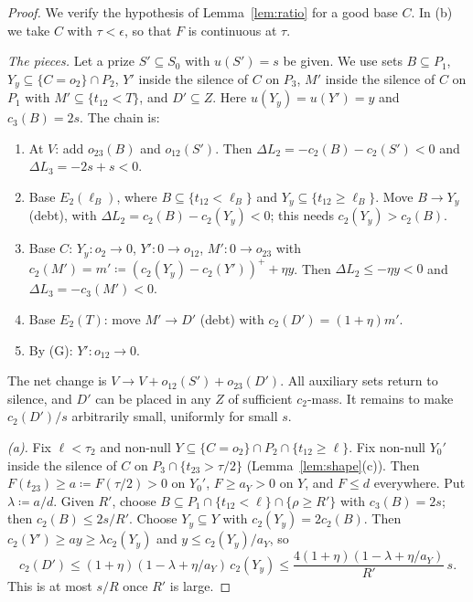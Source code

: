 \documentclass[11pt]{article}
\theoremstyle{definition}\newtheorem{definition}[theorem]{Definition}
\theoremstyle{remark}\newtheorem{remark}[theorem]{Remark}
\begin{document}
\begin{proof}
We verify the hypothesis of Lemma~\ref{lem:ratio} for a good base $C$. In (b)
we take $C$ with $\tau<\epsilon$, so that $F$ is continuous at $\tau$.

\emph{The pieces.} Let a prize $S'\subseteq S_0$ with $u(S')=s$ be given. We
use sets $B\subseteq P_1$, $Y_y\subseteq\{C=o_2\}\cap P_2$, $Y'$ inside the
silence of $C$ on $P_3$, $M'$ inside the silence of $C$ on $P_1$ with
$M'\subseteq\{t_{12}<T\}$, and $D'\subseteq Z$. Here $u(Y_y)=u(Y')=y$ and
$c_3(B)=2s$. The chain is:
\begin{enumerate}[label=\arabic*.,leftmargin=*,itemsep=2pt]
\item At $V$: add $o_{23}(B)$ and $o_{12}(S')$. Then
$\Delta L_2=-c_2(B)-c_2(S')<0$ and $\Delta L_3=-2s+s<0$.
\item Base $E_2(\ell_B)$, where $B\subseteq\{t_{12}<\ell_B\}$ and
$Y_y\subseteq\{t_{12}\ge\ell_B\}$. Move $B\to Y_y$ (debt), with
$\Delta L_2=c_2(B)-c_2(Y_y)<0$; this needs $c_2(Y_y)>c_2(B)$.
\item Base $C$: $Y_y\colon o_2\to0$, $Y'\colon0\to o_{12}$,
$M'\colon0\to o_{23}$ with $c_2(M')=m'\coloneqq(c_2(Y_y)-c_2(Y'))^++\eta y$.
Then $\Delta L_2\le-\eta y<0$ and $\Delta L_3=-c_3(M')<0$.
\item Base $E_2(T)$: move $M'\to D'$ (debt) with $c_2(D')=(1+\eta)m'$.
\item By (G): $Y'\colon o_{12}\to0$.
\end{enumerate}
The net change is $V\to V+o_{12}(S')+o_{23}(D')$. All auxiliary sets return
to silence, and $D'$ can be placed in any $Z$ of sufficient $c_2$-mass. It
remains to make $c_2(D')/s$ arbitrarily small, uniformly for small $s$.

\emph{(a).} Fix $\ell<\tau_2$ and non-null
$Y\subseteq\{C=o_2\}\cap P_2\cap\{t_{12}\ge\ell\}$. Fix non-null $Y_0'$
inside the silence of $C$ on $P_3\cap\{t_{23}>\tau/2\}$ (Lemma~\ref{lem:shape}(c)).
Then $F(t_{23})\ge a\coloneqq F(\tau/2)>0$ on $Y_0'$, $F\ge a_Y>0$ on $Y$, and
$F\le d$ everywhere. Put $\lambda\coloneqq a/d$. Given $R'$, choose
$B\subseteq P_1\cap\{t_{12}<\ell\}\cap\{\rho\ge R'\}$ with $c_3(B)=2s$; then
$c_2(B)\le2s/R'$. Choose $Y_y\subseteq Y$ with $c_2(Y_y)=2c_2(B)$. Then
$c_2(Y')\ge ay\ge\lambda c_2(Y_y)$ and $y\le c_2(Y_y)/a_Y$, so
\[
 c_2(D')\le(1+\eta)(1-\lambda+\eta/a_Y)\,c_2(Y_y)
 \le\frac{4(1+\eta)(1-\lambda+\eta/a_Y)}{R'}\,s .
\]
This is at most $s/R$ once $R'$ is large.


\end{proof}
\end{document}
